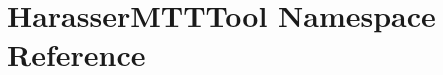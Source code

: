 \hypertarget{namespaceHarasserMTTTool}{\section{Harasser\-M\-T\-T\-Tool Namespace Reference}
\label{namespaceHarasserMTTTool}
}
